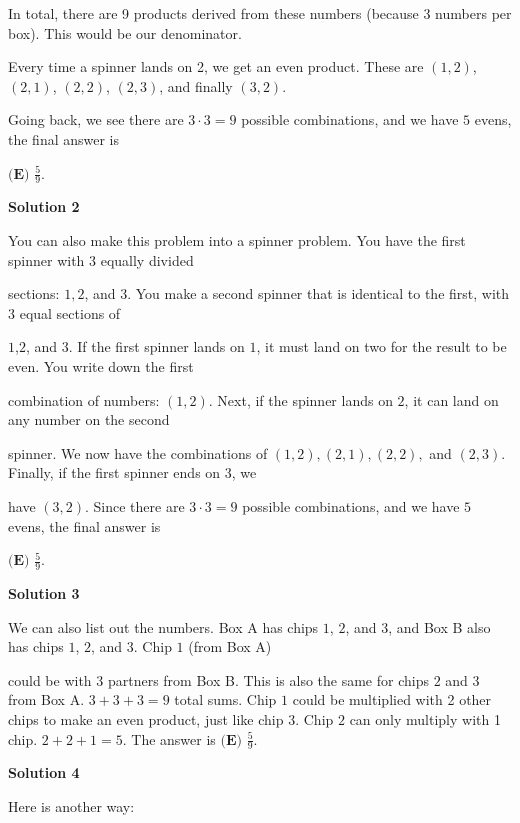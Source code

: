 \begin{enumerate}
 In total, there are 9 products derived from these numbers (because 3 numbers per box). This would be our denominator. 

 Every time a spinner lands on 2, we get an even product. These are $(1,2)$, $(2,1)$, $(2,2)$, $(2,3)$, and finally $(3,2)$. 

 Going back, we see there are $3\cdot3=9$ possible combinations, and we have $5$ evens, the final answer is  

 $\boxed{\textbf{(E) }\frac{5}{9}}$.

 



\textbf{Solution 2}

You can also make this problem into a spinner problem. You have the first spinner with $3$ equally divided 

 sections: $1, 2$, and $3$. You make a second spinner that is identical to the first, with $3$ equal sections of 

 $1$,$2$, and $3$. If the first spinner lands on $1$, it must land on two for the result to be even. You write down the first 

 combination of numbers: $(1,2)$. Next, if the spinner lands on $2$, it can land on any number on the second 

 spinner. We now have the combinations of $(1,2) ,(2,1), (2,2),$ and $(2,3)$. Finally, if the first spinner ends on $3$, we 

 have $(3,2).$ Since there are $3\cdot3=9$ possible combinations, and we have $5$ evens, the final answer is  

 $\boxed{\textbf{(E) }\frac{5}{9}}$.

 



\textbf{Solution 3}

We can also list out the numbers. Box A has chips $1$, $2$, and $3$, and Box B also has chips $1$, $2$, and $3$. Chip $1$ (from Box A) 

 could be with 3 partners from Box B. This is also the same for chips $2$ and $3$ from Box A. $3+3+3=9$ total sums. Chip $1$ could be multiplied with 2 other chips to make an even product, just like chip $3$. Chip $2$ can only multiply with 1 chip.  $2+2+1=5$. The answer is $\boxed{\textbf{(E) }\frac{5}{9}}$.

 



\textbf{Solution 4}

Here is another way:


\end{enumerate}
